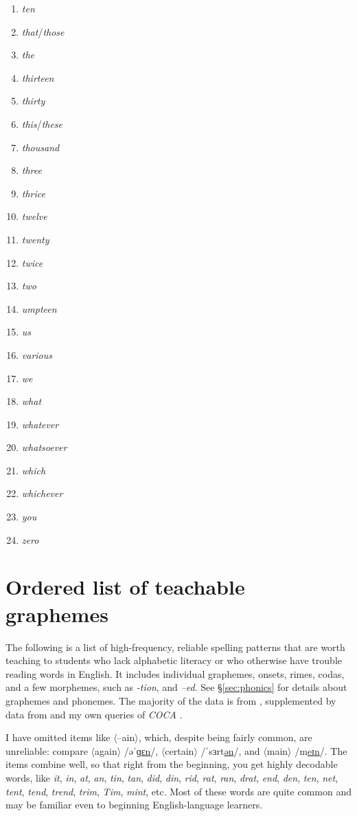 \begin{multicols}{3}
\begin{enumerate}[noitemsep]
\item\textit{ten}
\item\textit{that}/\textit{those}
\item\textit{the}
\item\textit{thirteen}
\item\textit{thirty}
\item\textit{this}/\textit{these}
\item\textit{thousand}
\item\textit{three}
\item\textit{thrice}
\item\textit{twelve}
\item\textit{twenty}
\item\textit{twice}
\item\textit{two}
\item\textit{umpteen}
\item\textit{us}
\item\textit{various}
\item\textit{we}
\item\textit{what}
\item\textit{whatever}
\item\textit{whatsoever}
\item\textit{which}
\item\textit{whichever}
\item\textit{you}
\item\textit{zero}
\end{enumerate}
\end{multicols}

\newpage
\chapter{Ordered list of teachable graphemes} \label{sec:gpcs-list}

The following is a list of high-frequency, reliable spelling patterns that are worth teaching to students who lack alphabetic literacy or who otherwise have trouble reading words in English. It includes individual graphemes, onsets, rimes, codas, and a few morphemes, such as \textit{-tion}, and \textit{--ed}. See \S\ref{sec:phonics} for details about graphemes and phonemes. The majority of the data is from \citet{Fry2004a}, supplemented by data from \citet{Gontijo2003} and my own queries of \textit{COCA} \citep{COCA}.

I have omitted items like $\langle$--ain$\rangle$, which, despite being fairly common, are unreliable: compare $\langle$again$\rangle$ /əˈɡ\uline{ɛn}/, $\langle$certain$\rangle$ /ˈsɜrt\uline{ən}/, and $\langle$main$\rangle$ /m\uline{eɪn}/. The items combine well, so that right from the beginning, you get highly decodable words, like \textit{it}, \textit{in}, \textit{at}, \textit{an}, \textit{tin}, \textit{tan}, \textit{did}, \textit{din}, \textit{rid}, \textit{rat}, \textit{ran}, \textit{drat}, \textit{end}, \textit{den}, \textit{ten}, \textit{net}, \textit{tent}, \textit{tend}, \textit{trend}, \textit{trim}, \textit{Tim}, \textit{mint}, etc. Most of these words are quite common and may be familiar even to beginning English-language learners.

